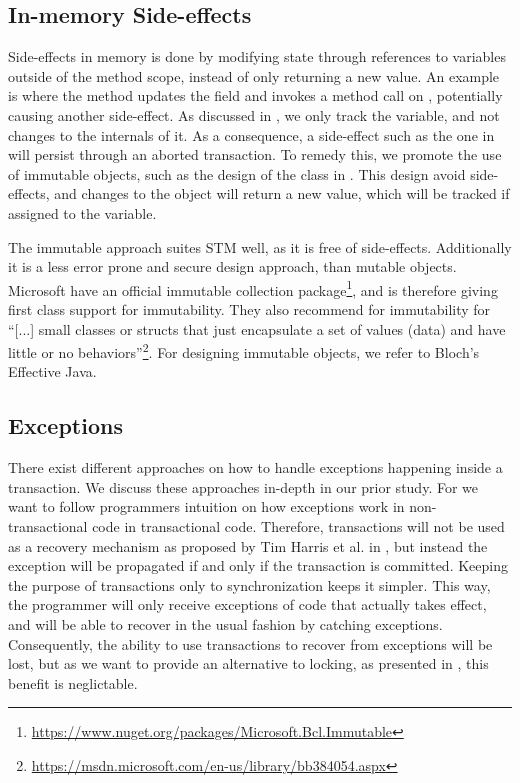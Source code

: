 \subsection{In-memory Side-effects}
Side-effects in memory is done by modifying state through references to variables outside of the method scope, instead of only returning a new value. An example is  where the  method updates the field  and invokes a method call on , potentially causing another side-effect. As discussed in , we only track the variable, and not changes to the internals of it. As a consequence, a side-effect such as the one in  will persist through an aborted transaction. To remedy this, we promote the use of immutable objects, such as the design of the  class in . This design avoid side-effects, and changes to the object will return a new value, which will be tracked if assigned to the variable.

The immutable approach suites \ac{STM} well, as it is free of side-effects. Additionally it is a less error prone and secure design approach, than mutable objects\cite[p. 73]{bloch2008effective}. Microsoft have an official immutable collection package\footnote{\url{https://www.nuget.org/packages/Microsoft.Bcl.Immutable}}, and is therefore giving first class support for immutability. They also recommend for immutability for ``[...] small classes or structs that just encapsulate a set of values (data) and have little or no behaviors''\footnote{\url{https://msdn.microsoft.com/en-us/library/bb384054.aspx}}. For designing immutable objects, we refer to Bloch's Effective Java\cite[p. 73-80]{bloch2008effective}.

\subsection{Exceptions}
There exist different approaches on how to handle exceptions happening inside a transaction. We discuss these approaches in-depth in our prior study\cite[p. 50-51]{dpt907e14trending}. For \stmnamesp we want to follow programmers intuition on how exceptions work in non-transactional code in transactional code. Therefore, transactions will not be used as a recovery mechanism as proposed by Tim Harris et al. in \cite{harris2005exceptions}, but instead the exception will be propagated if and only if the transaction is committed. Keeping the purpose of transactions only to synchronization keeps it simpler. This way, the programmer will only receive exceptions of code that actually takes effect, and will be able to recover in the usual fashion by catching exceptions. Consequently, the ability to use transactions to recover from exceptions will be lost, but as we want to provide an alternative to locking, as presented in , this benefit is neglictable.


